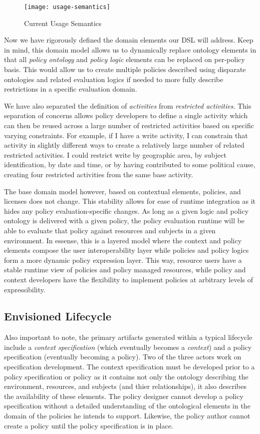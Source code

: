 \begin{figure}[!t]
\centering
\texttt{[image: usage-semantics]}
\caption{Current Usage Semantics}
\label{fig:model:usage-semantics}
\end{figure}

Now we have rigorously defined the domain elements our DSL will address.  Keep in mind, this domain model allows us to dynamically replace ontology elements in that all \textit{policy ontology} and \textit{policy logic} elements can be replaced on per-policy basis.  This would allow us to create multiple policies described using disparate ontologies and related evaluation logics if needed to more fully describe restrictions in a specific evaluation domain.

We have also separated the definition of \textit{activities} from \textit{restricted activities}.  This separation of concerns allows policy developers to define a single activity which can then be reused across a large number of restricted activities based on specific varying constraints.  For example, if I have a write activity, I can constrain that activity in slightly different ways to create a relatively large number of related restricted activities.  I could restrict write by geographic area, by subject identification, by date and time, or by having contributed to some political cause, creating four restricted activities from the same base activity.

The base domain model however, based on contextual elements, policies, and licenses does not change.  This stability allows for ease of runtime integration as it hides any policy evaluation-specific changes.  As long as a given logic and policy ontology is delivered with a given policy, the policy evaluation runtime will be able to evaluate that policy against resources and subjects in a given environment.  In essense, this is a layered model where the context and policy elements compose the user interoperability layer while policies and policy logics form a more dynamic policy expression layer.  This way, resource users have a stable runtime view of policies and policy managed resources, while policy and context developers have the flexibility to implement policies at arbitrary levels of expressibility.

\subsection{Envisioned Lifecycle}
Also important to note, the primary artifacts generated within a typical lifecycle include a \textit{context specification} (which eventually becomes a \textit{context}) and a policy specification (eventually becoming a policy).  Two of the three actors work on specification development.  The context specification must be developed prior to a policy specification or policy as it contains not only the ontology describing the environment, resources, and subjects (and thier relationships), it also describes the availability of these elements.  The policy designer cannot develop a policy specification without a detailed understanding of the ontological elements in the domain of the policies he intends to support.  Likewise, the policy author cannot create a policy until the policy specification is in place.

